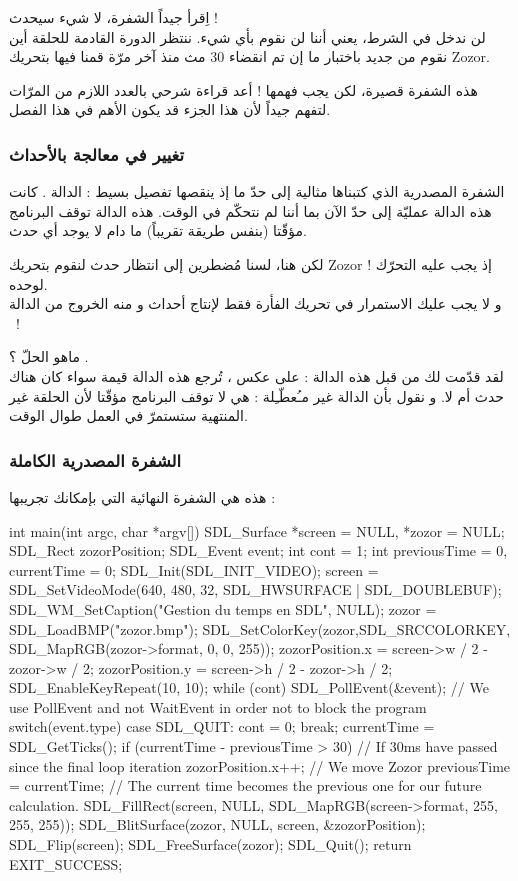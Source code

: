 اِقرأ جيداً الشفرة، لا شيء سيحدث !\\
لن ندخل في الشرط، يعني أننا لن نقوم بأي شيء. ننتظر الدورة القادمة للحلقة أين نقوم من جديد باختبار ما إن تم انقضاء 30 مث منذ آخر مرّة قمنا فيها بتحريك 
\textenglish{Zozor}.

هذه الشفرة قصيرة، لكن يجب فهمها ! أعد قراءة شرحي بالعدد اللازم من المرّات لتفهم جيداً لأن هذا الجزء قد يكون الأهم في هذا الفصل.

\subsubsection{تغيير في معالجة بالأحداث}

الشفرة المصدرية الذي كتبناها مثالية إلى حدّ ما إذ ينقصها تفصيل بسيط : الدالة 
.
كانت هذه الدالة عمليّة إلى حدّ الآن بما أننا لم نتحكّم في الوقت. هذه الدالة توقف البرنامج مؤقّتا (بنفس طريقة
تقريباً) ما دام لا يوجد أي حدث.

لكن هنا، لسنا مُضطرين إلى انتظار حدث لنقوم بتحريك
\textenglish{Zozor} !
إذ يجب عليه التحرّك لوحده.\\
و لا يجب عليك الاستمرار في تحريك الفأرة فقط لإنتاج أحداث و منه الخروج من الدالة 
~!

ماهو الحلّ ؟ 
.\\
لقد قدّمت لك من قبل هذه الدالة : على عكس
،
تُرجع هذه الدالة قيمة سواء كان هناك حدث أم لا. و نقول بأن الدالة غير مـُعطّـِلة : هي لا توقف البرنامج مؤقّتا لأن الحلقة غير المنتهية ستستمرّ في العمل طوال الوقت.

\subsubsection{الشفرة المصدرية الكاملة}

هذه هي الشفرة النهائية التي بإمكانك تجريبها :

\begin{Csource}
int main(int argc, char *argv[])
{
	SDL_Surface *screen = NULL, *zozor = NULL;
	SDL_Rect zozorPosition;
	SDL_Event event;
	int cont = 1;
	int previousTime = 0, currentTime = 0;
	SDL_Init(SDL_INIT_VIDEO);
	screen = SDL_SetVideoMode(640, 480, 32, SDL_HWSURFACE | SDL_DOUBLEBUF);
	SDL_WM_SetCaption("Gestion du temps en SDL", NULL);
	zozor = SDL_LoadBMP("zozor.bmp");
	SDL_SetColorKey(zozor,SDL_SRCCOLORKEY, SDL_MapRGB(zozor->format, 0, 0, 255));
	zozorPosition.x = screen->w / 2 - zozor->w / 2;
	zozorPosition.y = screen->h / 2 - zozor->h / 2;
	SDL_EnableKeyRepeat(10, 10);
	while (cont)
	{
		SDL_PollEvent(&event); // We use PollEvent and not WaitEvent in order not to block the program
		switch(event.type)
		{
			case SDL_QUIT:
			cont = 0;
			break;
		}
		currentTime = SDL_GetTicks();
		if (currentTime - previousTime > 30) // If 30ms have passed since the final loop iteration
		{
			zozorPosition.x++; // We move Zozor
			previousTime = currentTime; // The current time becomes the previous one for our future calculation.
		}
		SDL_FillRect(screen, NULL, SDL_MapRGB(screen->format, 255, 255, 255));
		SDL_BlitSurface(zozor, NULL, screen, &zozorPosition);
		SDL_Flip(screen);
	}
	SDL_FreeSurface(zozor);
	SDL_Quit();
	return EXIT_SUCCESS;
}
\end{Csource}

